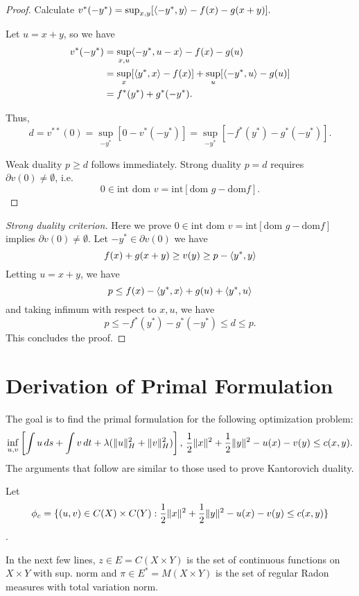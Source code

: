 \begin{proof}
	Calculate $v^{*}(-y^{*}) = \sup_{x,y}[\ang*{-y^{*},y}-f(x)-g(x+y)].$
	
	Let $u = x+y$, so we have
	\begin{align*}
	v^{*}(-y^{*}) &= \sup_{x,u} \ang*{-y^{*},u-x} - f(x) - g(u) \\
	&= \sup_x [\ang*{y^{*},x}-f(x)]+\sup_u [\ang*{-y^{*},u}-g(u)] \\
	&= f^{*}(y^{*}) + g^{*}(-y^{*}).
	\end{align*}
	
	Thus,
	$$d = v^{**}(0) = \sup_{-y^{*}}[0 - v^{*}(-y^{*})] = \sup_{-y^{*}}[-f^{*}(y^{*})-g^{*}(-y^{*})].$$
	
	Weak duality $p\geq d$ follows immediately. Strong duality $p=d$ requires $\partial v(0)\neq \emptyset$, i.e.
	$$0\in \textrm{int dom }v = \textrm{int}[\textrm{dom } g-\textrm{dom} f].$$
\end{proof}

\begin{proof}[Strong duality criterion]
	Here we prove $0\in \textrm{int dom }v = \textrm{int}[\textrm{dom } g-\textrm{dom} f]$ implies $\partial v(0)\neq \emptyset$. Let $-y^{*}\in \partial v(0)$ we have
	$$
	f(x)+g(x+y)\geq v(y)\geq p-\ang*{y^{*},y}
	$$
	Letting $u=x+y$, we have
	$$p\leq f(x)-\ang*{y^{*},x}+g(u)+\ang*{y^{*},u}
	$$ and taking infimum with respect to $x,u$, we have
	$$
	p\leq -f^{*}(y^{*})-g^{*}(-y^{*})\leq d\leq p.
	$$
	This concludes the proof.
\end{proof}

\section*{Derivation of Primal Formulation}

The goal is to find the primal formulation for the following optimization problem: 
$$ \inf_{u,v} \left[ \int u \, ds + \int v \, dt + \lambda (\norm{u}_H^2 + \norm{v}_H^2)\right],\, \frac{1}{2}\norm{x}^2 + \frac{1}{2}\norm{y}^2 - u(x) - v(y)\leq c(x,y). $$ The arguments that follow are similar to those used to prove Kantorovich duality.

Let $$\phi_c = \{ (u,v) \in C(X)\times C(Y): \frac{1}{2}\norm{x}^2 + \frac{1}{2}\norm{y}^2 - u(x) - v(y)\leq c(x,y)\}$$.

In the next few lines, $z \in E = C(X\times Y)$ is the set of continuous functions on $X\times Y$ with sup. norm and $\pi\in E^{*} = M(X\times Y)$ is the set of regular Radon measures with total variation norm.

